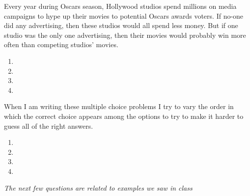 \documentclass{article}
\begin{document}
\begin{question}[type=exam]{4}
  Every year during Oscars season, Hollywood studios spend millions on media campaigns to hype up their movies to potential Oscars awards voters. 
  If no-one did any advertising, then these studios would all spend less money. 
  But if one studio was the only one advertising, then their movies would probably win more often than competing studios' movies.
  \begin{enumerate}[label=\alph*), noitemsep]
    \item {}
    \item {}
    \item {}
    \item {}
  \end{enumerate}
\end{question}

\begin{question}[type=exam]{4}
  When I am writing these multiple choice problems
  I try to vary the order in which the correct choice appears among the options
  to try to make it harder to guess all of the right answers.
  \begin{enumerate}[label=\alph*), noitemsep]
    \item {}
    \item {} 
    \item {} 
    \item {}
  \end{enumerate}
\end{question}

\textit{The next few questions are related to examples we saw in class}
\end{document}

